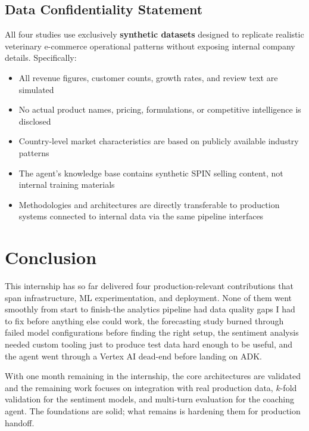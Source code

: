 \documentclass[11pt,a4paper]{article}
\begin{document}
\subsection{Data Confidentiality Statement}
All four studies use exclusively \textbf{synthetic datasets} designed to replicate realistic veterinary e-commerce operational patterns without exposing internal company details. Specifically:
\begin{itemize}[leftmargin=*,noitemsep,topsep=2pt]
    \item All revenue figures, customer counts, growth rates, and review text are simulated
    \item No actual product names, pricing, formulations, or competitive intelligence is disclosed
    \item Country-level market characteristics are based on publicly available industry patterns
    \item The agent's knowledge base contains synthetic SPIN selling content, not internal training materials
    \item Methodologies and architectures are directly transferable to production systems connected to internal data via the same pipeline interfaces
\end{itemize}

\section{Conclusion}

This internship has so far delivered four production-relevant contributions that span infrastructure, ML experimentation, and deployment. None of them went smoothly from start to finish-the analytics pipeline had data quality gaps I had to fix before anything else could work, the forecasting study burned through failed model configurations before finding the right setup, the sentiment analysis needed custom tooling just to produce test data hard enough to be useful, and the agent went through a Vertex AI dead-end before landing on ADK.

With one month remaining in the internship, the core architectures are validated and the remaining work focuses on integration with real production data, $k$-fold validation for the sentiment models, and multi-turn evaluation for the coaching agent. The foundations are solid; what remains is hardening them for production handoff.
\end{document}
